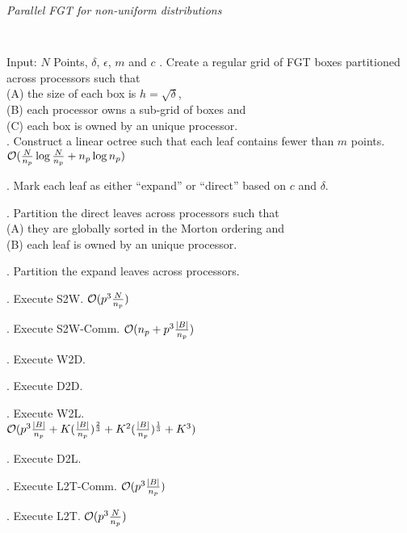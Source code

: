 \begin{algorithm}[!h]
\caption{ \label{a:ofgt}
\em Parallel FGT for non-uniform distributions}
{\tt
\begin{algorithmic}
\STATE Input: $N$ Points, $\delta$, $\epsilon$, $m$ and $c$
. Create a regular grid of FGT boxes partitioned across processors such that \\
 (A) the size of each box is $h = \sqrt{\delta}$, \\
 (B) each processor owns a sub-grid of boxes and \\
 (C) each box is owned by an unique processor. \\

. Construct a linear octree such that each leaf contains fewer than $m$ points. \\
\hfill $\mathcal{O}(\frac{N}{n_p} \log{\frac{N}{n_p}} + n_p \log{n_p})$

. Mark each leaf as either ``expand'' or ``direct'' based on $c$ and $\delta$.

. Partition the direct leaves across processors such that \\
  (A) they are globally sorted in the Morton ordering and \\
  (B) each leaf is owned by an unique processor.

. Partition the expand leaves across processors. 

. Execute S2W. \hfill $\mathcal{O}(p^3 \frac{N}{n_p})$

. Execute S2W-Comm. \hfill $\mathcal{O}(n_p + p^3\frac{|B|}{n_p})$

. Execute W2D. 

. Execute D2D. 

. Execute W2L. \\
 \hfill $\mathcal{O}(p^3 \frac{|B|}{n_p} + K (\frac{|B|}{n_p})^{\frac{2}{3}} + K^2(\frac{|B|}{n_p})^{\frac{1}{3}} + K^3 )$ 

. Execute D2L. 

. Execute L2T-Comm. \hfill $\mathcal{O}(p^3\frac{|B|}{n_p})$ 

. Execute L2T. \hfill $\mathcal{O}( p^3\frac{N}{n_p})$
\end{algorithmic}
}
\end{algorithm}


